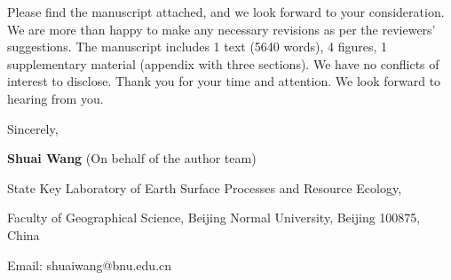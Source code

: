 \documentclass[11pt,a4paper,roman]{moderncv}
\begin{document}
Please find the manuscript attached, and we look forward to your consideration. We are more than happy to make any necessary revisions as per the reviewers' suggestions. The manuscript includes 1 text (5640 words), 4 figures, 1 supplementary material (appendix with three sections). We have no conflicts of interest to disclose. Thank you for your time and attention. We look forward to hearing from you.


Sincerely,

\textbf{Shuai Wang} (On behalf of the author team)

State Key Laboratory of Earth Surface Processes and Resource Ecology,

Faculty of Geographical Science, Beijing Normal University, Beijing 100875, China

Email: shuaiwang@bnu.edu.cn



\end{document}
